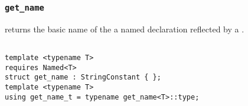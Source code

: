 
\subsubsection{\texttt{get\_name}}

returns the basic name of the a named declaration reflected by a .

\begin{verbatim}

template <typename T>
requires Named<T>
struct get_name : StringConstant { };
template <typename T>
using get_name_t = typename get_name<T>::type;

\end{verbatim}
